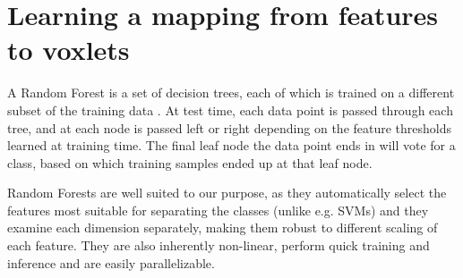 \documentclass[10pt,twocolumn,letterpaper]{article}
\makeatletter
\renewcommand*{\eg}{e.g.\@\xspace}
\newcommand{\point}{\mathbf{p}}
\makeatother
\begin{document}



\section{Learning a mapping from features to voxlets}


A Random Forest is a set of decision trees, each of which is trained on a different subset of the training data \cite{breiman-ml-2001}.
At test time, each data point is passed through each tree, and at each node is passed left or right depending on the feature thresholds learned at training time. The final leaf node the data point ends in will vote for a class, based on which training samples ended up at that leaf node.

Random Forests are well suited to our purpose, as they automatically select the features most suitable for separating the classes (unlike \eg SVMs) and they examine each dimension separately, making them robust to different scaling of each feature. They are also inherently non-linear, perform quick training and inference and are easily parallelizable.
\end{document}
